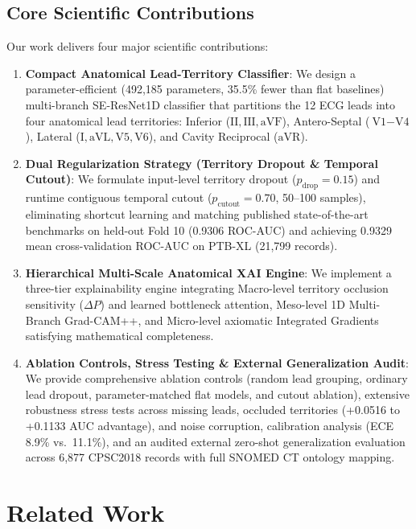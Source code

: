 \documentclass[5p,twocolumn,10pt]{elsarticle}
\begin{document}
\subsection{Core Scientific Contributions}
Our work delivers four major scientific contributions:
\begin{enumerate}
    \item \textbf{Compact Anatomical Lead-Territory Classifier}: We design a parameter-efficient (492,185 parameters, 35.5\% fewer than flat baselines) multi-branch SE-ResNet1D classifier that partitions the 12 ECG leads into four anatomical lead territories: Inferior ($\text{II}, \text{III}, \text{aVF}$), Antero-Septal ($\text{V1}-\text{V4}$), Lateral ($\text{I}, \text{aVL}, \text{V5}, \text{V6}$), and Cavity Reciprocal ($\text{aVR}$).
    \item \textbf{Dual Regularization Strategy (Territory Dropout \& Temporal Cutout)}: We formulate input-level territory dropout ($p_{\text{drop}} = 0.15$) and runtime contiguous temporal cutout ($p_{\text{cutout}} = 0.70$, 50--100 samples), eliminating shortcut learning and matching published state-of-the-art benchmarks on held-out Fold 10 (0.9306 ROC-AUC) and achieving 0.9329 mean cross-validation ROC-AUC on PTB-XL (21,799 records).
    \item \textbf{Hierarchical Multi-Scale Anatomical XAI Engine}: We implement a three-tier explainability engine integrating Macro-level territory occlusion sensitivity ($\Delta P$) and learned bottleneck attention, Meso-level 1D Multi-Branch Grad-CAM++, and Micro-level axiomatic Integrated Gradients satisfying mathematical completeness.
    \item \textbf{Ablation Controls, Stress Testing \& External Generalization Audit}: We provide comprehensive ablation controls (random lead grouping, ordinary lead dropout, parameter-matched flat models, and cutout ablation), extensive robustness stress tests across missing leads, occluded territories (+0.0516 to +0.1133 AUC advantage), and noise corruption, calibration analysis (ECE 8.9\% vs.\ 11.1\%), and an audited external zero-shot generalization evaluation across 6,877 CPSC2018 records with full SNOMED CT ontology mapping.
\end{enumerate}

\section{Related Work}
\label{sec:related}
\end{document}
